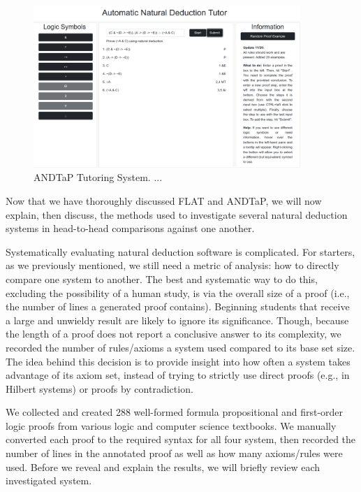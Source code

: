 \documentclass[ms]{uncgdissertationexp2}
\theoremstyle{plain}
\theoremstyle{definition}
\theoremstyle{remark}
\newcommand{\titlecaption}[2]{\caption[#1]{#1. #2}}
\begin{document}
\begin{figure}[!ht]
	\centering
	\includegraphics[width=0.9\textwidth]{andtap-tutor.png}
	\titlecaption{ANDTaP Tutoring System}{...}
	\label{fig:andtap}
\end{figure} 

Now that we have thoroughly discussed FLAT and ANDTaP, we will now explain, then discuss, the methods used to investigate several natural deduction systems in head-to-head comparisons against one another.

Systematically evaluating natural deduction software is complicated. For starters, as we previously mentioned, we still need a metric of analysis: how to directly compare one system to another. The best and systematic way to do this, excluding the possibility of a human study, is via the overall size of a proof (i.e., the number of lines a generated proof contains). Beginning students that receive a large and unwieldy result are likely to ignore its significance. Though, because the length of a proof does not report a conclusive answer to its complexity, we recorded the number of rules/axioms a system used compared to its base set size. The idea behind this decision is to provide insight into how often a system takes advantage of its axiom set, instead of trying to strictly use direct proofs (e.g., in Hilbert systems) or proofs by contradiction. 

We collected and created 288 well-formed formula propositional and first-order logic proofs from various logic and computer science textbooks. We manually converted each proof to the required syntax for all four system, then recorded the number of lines in the annotated proof as well as how many axioms/rules were used. Before we reveal and explain the results, we will briefly review each investigated system.
\end{document}
